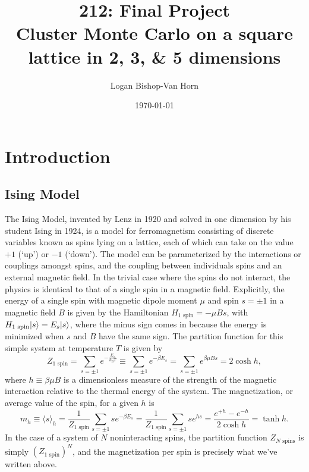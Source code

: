 \documentclass[11pt, oneside]{article}
\title{212: Final Project\\Cluster Monte Carlo on a square lattice in 2, 3, \& 5 dimensions}
\author{Logan Bishop-Van Horn}
\date{\today}
\DeclarePairedDelimiter\ket{\lvert}{\rangle}
\newcommand{\kB}{k_\text{B}}
\begin{document}
\maketitle
%
%
\section{Introduction}
\subsection{Ising Model}
The Ising Model, invented by Lenz in 1920 and solved in one dimension by his student Ising in 1924, is a model for ferromagnetism consisting of discrete variables known as spins lying on a lattice, each of which can take on the value $+1$ (`up') or $-1$ (`down'). The model can be parameterized by the interactions or couplings amongst spins, and the coupling between individuals spins and an external magnetic field. In the trivial case where the spins do not interact, the physics is identical to that of a single spin in a magnetic field. Explicitly, the energy of a single spin with magnetic dipole moment $\mu$ and spin $s=\pm1$ in a magnetic field $B$ is given by the Hamiltonian $H_\text{1 spin}=-\mu Bs$, with $H_\text{1 spin}\ket{s}=E_s\ket{s}$, where the minus sign comes in because the energy is minimized when $s$ and $B$ have the same sign. The partition function for this simple system at temperature $T$ is given by
$$Z_\text{1 spin} = \sum_{s=\pm1}e^{-\frac{E_s}{\kB T}}\equiv\sum_{s=\pm1}e^{-\beta E_s}=\sum_{s=\pm1}e^{\beta\mu Bs}=2\cosh h,$$
where $h\equiv\beta\mu B$ is a dimensionless measure of the strength of the magnetic interaction relative to the thermal energy of the system. The magnetization, or average value of the spin, for a given $h$ is
$$m_h\equiv\langle{s}\rangle_h=\frac1{Z_\text{1 spin}}\sum_{s=\pm1}se^{-\beta E_s}=\frac1{Z_\text{1 spin}}\sum_{s=\pm1}se^{hs}=\frac{e^{+h}-e^{-h}}{2\cosh h}=\tanh h.$$
In the case of a system of $N$ noninteracting spins, the partition function $Z_\text{$N$ spins}$ is simply $(Z_\text{1 spin})^N$, and the magnetization per spin is precisely what we've written above.
\end{document}
